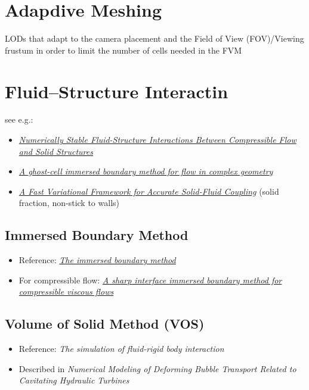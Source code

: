 \section{Adapdive Meshing}

LODs that adapt to the camera placement and the Field of View (FOV)/Viewing frustum in order to limit the number of cells needed in the FVM

\section{Fluid--Structure Interactin}

see e.g.:

\begin{itemize}
    \item \textit{\href{http://physbam.stanford.edu/~fedkiw/papers/stanford2010-04.pdf}{Numerically Stable Fluid-Structure Interactions Between Compressible Flow and Solid Structures}}
    \item \textit{\href{http://efdl.as.ntu.edu.tw/research/papers/JCP03GCIBM.pdf}{A ghost-cell immersed boundary method for flow in complex geometry}}
    \item \textit{\href{http://www.cs.columbia.edu/~batty/papers/Batty07.pdf}{A Fast Variational Framework for Accurate Solid-Fluid Coupling}} (solid fraction, non-stick to walls)
\end{itemize}

\subsection{Immersed Boundary Method}

\begin{itemize}
    \item Reference: \textit{\href{http://www4.ncsu.edu/~zhilin/TEACHING/MA798Z/Peskin1.pdf}{The immersed boundary method}}
    \item For compressible flow: \textit{\href{http://www.cecs.wright.edu/~haibo.dong/wp-content/themes/publications/IBM_JCP_2007.pdf}{A sharp interface immersed boundary method for compressible viscous flows}}
\end{itemize}

\subsection{Volume of Solid Method (VOS)}

\begin{itemize}
    \item Reference: \textit{The simulation of fluid-rigid body interaction}
    \item Described in \textit{Numerical Modeling of Deforming Bubble Transport Related to Cavitating Hydraulic Turbines}
\end{itemize}


